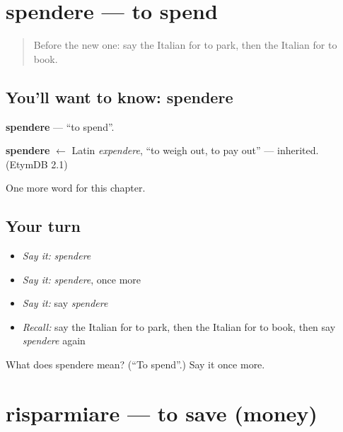 \section[spendere]{spendere — to spend}

\label{lesson:IT-C204-spendere}



\begin{quote}
Before the new one: say the Italian for to park, then the Italian for to book.
\end{quote}

\subsection*{You'll want to know: spendere}
\textbf{spendere} — \textquotedblleft{}to spend\textquotedblright{}.

\begin{cousinweb}
\textbf{spendere} $\leftarrow$ Latin \emph{expendere}, \textquotedblleft{}to weigh out, to pay out\textquotedblright{} — inherited. (EtymDB 2.1)
\end{cousinweb}

\begin{grammarlens}[title={What you've built}]
One more word for this chapter.
\end{grammarlens}

\subsection*{Your turn}
\begin{itemize}
\raggedright
  \item \emph{Say it:} \emph{spendere}
  \item \emph{Say it:} \emph{spendere}, once more
  \item \emph{Say it:} say \emph{spendere}
  \item \emph{Recall:} say the Italian for to park, then the Italian for to book, then say \emph{spendere} again
\end{itemize}

\begin{tcolorbox}[breakable,colback=teal!4,colframe=teal!35!black,title={Before you move on}]
What does spendere mean? (\textquotedblleft{}To spend\textquotedblright{}.) Say it once more.
\end{tcolorbox}
\section[risparmiare]{risparmiare — to save (money)}

